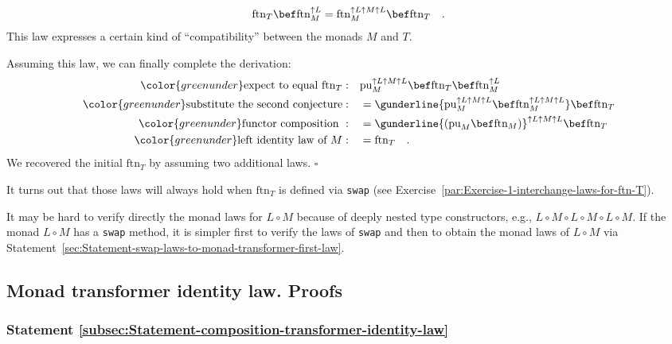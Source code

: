 ~\vspace{-0.35\baselineskip}
\begin{equation}
\text{ftn}_{T}\bef\text{ftn}_{M}^{\uparrow L}=\text{ftn}_{M}^{\uparrow L\uparrow M\uparrow L}\bef\text{ftn}_{T}\quad.\label{eq:ftn-second-compatibility-law}
\end{equation}
This law expresses a certain kind of \textsf{``}compatibility\textsf{''} between the
monads $M$ and $T$.

Assuming this law, we can finally complete the derivation:
\begin{align*}
{\color{greenunder}\text{expect to equal }\text{ftn}_{T}:}\quad & \text{pu}_{M}^{\uparrow L\uparrow M\uparrow L}\bef\text{ftn}_{T}\bef\text{ftn}_{M}^{\uparrow L}\\
{\color{greenunder}\text{substitute the second conjecture}:}\quad & =\gunderline{\text{pu}_{M}^{\uparrow L\uparrow M\uparrow L}\bef\text{ftn}_{M}^{\uparrow L\uparrow M\uparrow L}}\bef\text{ftn}_{T}\\
{\color{greenunder}\text{functor composition }:}\quad & =\gunderline{(\text{pu}_{M}\bef\text{ftn}_{M})}^{\uparrow L\uparrow M\uparrow L}\bef\text{ftn}_{T}\\
{\color{greenunder}\text{left identity law of }M:}\quad & =\text{ftn}_{T}\quad.
\end{align*}
We recovered the initial $\text{ftn}_{T}$ by assuming two additional
laws. $\square$

It turns out that those laws will always hold when $\text{ftn}_{T}$
is defined via \lstinline!swap! (see Exercise~\ref{par:Exercise-1-interchange-laws-for-ftn-T}).

It may be hard to verify directly the monad laws for $L\circ M$ because
of deeply nested type constructors, e.g., $L\circ M\circ L\circ M\circ L\circ M$.
If the monad $L\circ M$ has a \lstinline!swap! method, it is simpler
first to verify the laws of \lstinline!swap! and then to obtain the
monad laws of $L\circ M$ via Statement~\ref{sec:Statement-swap-laws-to-monad-transformer-first-law}.

\subsection{Monad transformer identity law. Proofs}

\subsubsection{Statement \label{subsec:Statement-composition-transformer-identity-law}\ref{subsec:Statement-composition-transformer-identity-law}}

